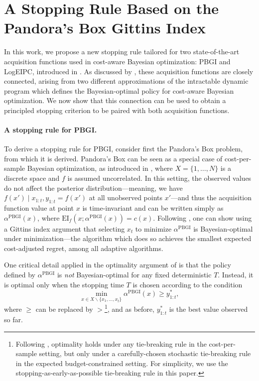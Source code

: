 \section{A Stopping Rule Based on the Pandora's Box Gittins Index}
\label{sec:method}


In this work, we propose a new stopping rule tailored for two state-of-the-art acquisition functions used in cost-aware Bayesian optimization: PBGI and LogEIPC, introduced in .
As discussed by \citet{xie2024cost}, these acquisition functions are closely connected, arising from two different approximations of the intractable dynamic program which defines the Bayesian-optimal policy for cost-aware Bayesian optimization.
We now show that this connection can be used to obtain a principled stopping criterion to be paired with both acquisition functions.

\paragraph{A stopping rule for PBGI.}

To derive a stopping rule for PBGI, consider first the Pandora’s Box problem, from which it is derived.
Pandora’s Box can be seen as a special case of cost-per-sample Bayesian optimization, as introduced in , where $X = \{1,\dots,N\}$ is a discrete space and $f$ is assumed uncorrelated.
In this setting, the observed values do not affect the posterior distribution---meaning, we have $f(x') \mid x_{1:t}, y_{1:t} = f(x')$ at all unobserved points $x'$---and thus the acquisition function value at point $x$ is time-invariant and can be written simply as $\alpha^{\mathrm{PBGI}}(x)$, where $\mathrm{EI}_{f}(x; \alpha^{\mathrm{PBGI}}(x)) = c(x)$.
Following \citet{weitzman1979optimal}, one can show using a Gittins index argument that selecting $x_t$ to minimize $\alpha^{\mathrm{PBGI}}$ is Bayesian-optimal under minimization—the algorithm which does so achieves the smallest expected cost-adjusted regret, among all adaptive algorithms.

One critical detail applied in the optimality argument of \citet{weitzman1979optimal} is that the policy defined by $\alpha^{\mathrm{PBGI}}$ is \emph{not} Bayesian-optimal for any fixed deterministic $T$.
Instead, it is optimal only when the stopping time $T$ is chosen according to the condition
\begin{equation}
\label{eqn:Weitzman_stopping}
\min_{x\in X\backslash\{x_1,\dots,x_t\}}\alpha^{\mathrm{PBGI}}(x) \geq y^*_{1:t},  
\end{equation}
where $\geq$ can be replaced by $>$\footnote{Following \citet[Appendix B]{xie2024cost}, optimality holds under any tie-breaking rule in the cost-per-sample setting, but only under a carefully-chosen stochastic tie-breaking rule in the expected budget-constrained setting. For simplicity, we use the stopping-as-early-as-possible tie-breaking rule in this paper.}, and as before, $y^*_{1:t}$ is the best value observed so far.

